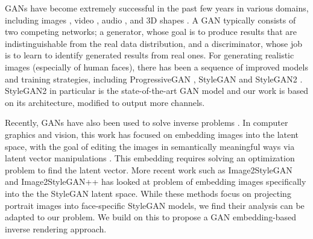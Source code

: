 GANs \cite{goodfellow2014generative} have become extremely successful in the past few years in various domains, including images \cite{radford2015unsupervised}, video \cite{tulyakov2018mocogan}, audio \cite{donahue2018synthesizing}, and 3D shapes \cite{li2019synthesizing}. A GAN typically consists of two competing networks; a generator, whose goal is to produce results that are indistinguishable from the real data distribution, and a discriminator, whose job is to learn to identify generated results from real ones. For generating realistic images (especially of human faces), there has been a sequence of improved models and training strategies, including ProgressiveGAN \cite{karras2018progressive}, StyleGAN \cite{karras2019style} and StyleGAN2 \cite{karras2020analyzing}. StyleGAN2 in particular is the state-of-the-art GAN model and our work is based on its architecture, modified to output more channels.

Recently, GANs have also been used to solve inverse problems \cite{bora2017compressed,asim2020invertible,o2019learning}.
In computer graphics and vision, this work has focused on embedding images into the latent space, with the goal of editing the images in semantically meaningful ways via latent vector manipulations \cite{zhu2016generative}. This embedding requires solving an optimization problem to find the latent vector.
More recent work such as Image2StyleGAN \cite{abdal2019image2stylegan} and Image2StyleGAN++ \cite{abdal2020image2stylegan++} has looked at problem of embedding images specifically into the the StyleGAN latent space. While these methods focus on projecting portrait images into face-specific StyleGAN models, we find their analysis can be adapted to our problem.
We build on this to propose a GAN embedding-based inverse rendering approach.
